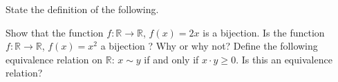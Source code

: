 \documentclass[11pt]{exam}
\theoremstyle{definition}
\begin{document}
\begin{questions}
\question State the definition of the following. 

\newpage 

\question Show that the function $f:\mathbb{R}\rightarrow \mathbb{R}$, $f(x)=2x$  is a bijection. 
\vfill
\question Is the function $f:\mathbb{R}\rightarrow \mathbb{R}$, $f(x)=x^2$ a bijection ? Why or why not? 
\vspace{2.5 in}
\newpage
Define the following equivalence relation on $\mathbb{R}$: $x\sim y$ if and only if $x\cdot y\geq 0$. Is this an equivalence relation?
\end{questions}
\end{document}
